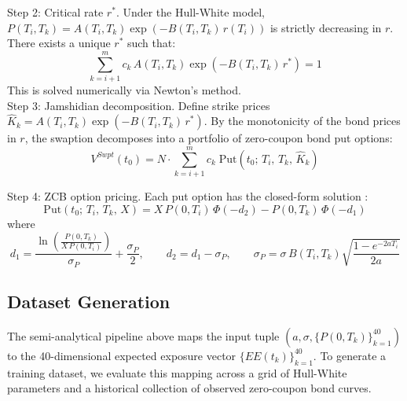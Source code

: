  \noindent  
  Step 2: Critical rate $r^*$. Under the Hull-White model, $P(T_i, T_k) = A(T_i, T_k)\exp(-B(T_i, T_k)\,r(T_i))$ is strictly decreasing in $r$. There exists a unique $r^*$ such
  that:
  \begin{equation}
      \sum_{k=i+1}^{m} c_k \, A(T_i, T_k)\exp\!\left(-B(T_i, T_k)\, r^*\right) = 1
  \end{equation}
  This is solved numerically via Newton's method. \\
  
  \noindent
  Step 3: Jamshidian decomposition. Define strike prices $\hat{K}_k = A(T_i, T_k)\exp(-B(T_i, T_k)\, r^*)$. By the monotonicity of the bond prices in $r$, the swaption decomposes
  into a portfolio of zero-coupon bond put options:
  \begin{equation}
      V^{Swpt}(t_0) = N \cdot \sum_{k=i+1}^{m} c_k \; \text{Put}(t_0;\, T_i,\, T_k,\, \hat{K}_k)
  \end{equation}

  \noindent
  Step 4: ZCB option pricing. Each put option has the closed-form solution \cite{hull1994numerical}:
  \begin{equation}
      \text{Put}(t_0;\, T_i,\, T_k,\, X) = X\, P(0,T_i)\,\Phi(-d_2) - P(0,T_k)\,\Phi(-d_1)
  \end{equation}
  where
  \begin{equation}
      d_1 = \frac{\ln\!\left(\frac{P(0,T_k)}{X\,P(0,T_i)}\right)}{\sigma_P} + \frac{\sigma_P}{2}, \qquad d_2 = d_1 - \sigma_P, \qquad \sigma_P = \sigma\, B(T_i, T_k)\sqrt{\frac{1 - e^{-2a
  T_i}}{2a}}
  \end{equation}


  \subsection{Dataset Generation}

  The semi-analytical pipeline above maps the input tuple $(a, \sigma, \{P(0, T_k)\}_{k=1}^{40})$ to the 40-dimensional expected exposure vector $\{EE(t_k)\}_{k=1}^{40}$. To generate a
  training dataset, we evaluate this mapping across a grid of Hull-White parameters and a historical collection of observed zero-coupon bond curves.

